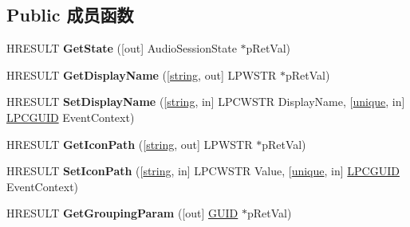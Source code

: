 \subsection*{Public 成员函数}
\begin{DoxyCompactItemize}
\item 
\mbox{\label{interface_i_audio_session_control_a710bf3db462d2ec35e05d3807e80df9f}} 
H\+R\+E\+S\+U\+LT {\bfseries Get\+State} (\mbox{[}out\mbox{]} Audio\+Session\+State $\ast$p\+Ret\+Val)
\item 
\mbox{\label{interface_i_audio_session_control_a1baab2fec48914005cfb26c987fa14b1}} 
H\+R\+E\+S\+U\+LT {\bfseries Get\+Display\+Name} (\mbox{[}\hyperlink{structstring}{string}, out\mbox{]} L\+P\+W\+S\+TR $\ast$p\+Ret\+Val)
\item 
\mbox{\label{interface_i_audio_session_control_ab5d751eb82d126c28cf7f14b7c0c06b2}} 
H\+R\+E\+S\+U\+LT {\bfseries Set\+Display\+Name} (\mbox{[}\hyperlink{structstring}{string}, in\mbox{]} L\+P\+C\+W\+S\+TR Display\+Name, \mbox{[}\hyperlink{interfaceunique}{unique}, in\mbox{]} \hyperlink{interface_g_u_i_d}{L\+P\+C\+G\+U\+ID} Event\+Context)
\item 
\mbox{\label{interface_i_audio_session_control_a013d1e0417373a4fb93dde6717571c96}} 
H\+R\+E\+S\+U\+LT {\bfseries Get\+Icon\+Path} (\mbox{[}\hyperlink{structstring}{string}, out\mbox{]} L\+P\+W\+S\+TR $\ast$p\+Ret\+Val)
\item 
\mbox{\label{interface_i_audio_session_control_a92579c174cb8e1f7b3222436513cdf0b}} 
H\+R\+E\+S\+U\+LT {\bfseries Set\+Icon\+Path} (\mbox{[}\hyperlink{structstring}{string}, in\mbox{]} L\+P\+C\+W\+S\+TR Value, \mbox{[}\hyperlink{interfaceunique}{unique}, in\mbox{]} \hyperlink{interface_g_u_i_d}{L\+P\+C\+G\+U\+ID} Event\+Context)
\item 
\mbox{\label{interface_i_audio_session_control_a7b0b30f15935e4b1194487d529240b04}} 
H\+R\+E\+S\+U\+LT {\bfseries Get\+Grouping\+Param} (\mbox{[}out\mbox{]} \hyperlink{interface_g_u_i_d}{G\+U\+ID} $\ast$p\+Ret\+Val)
\item 
\mbox{\label{interface_i_audio_session_control_a00fbb19aef4eb2d2ff0ab8c411c1546c}} 

\end{DoxyCompactItemize}

